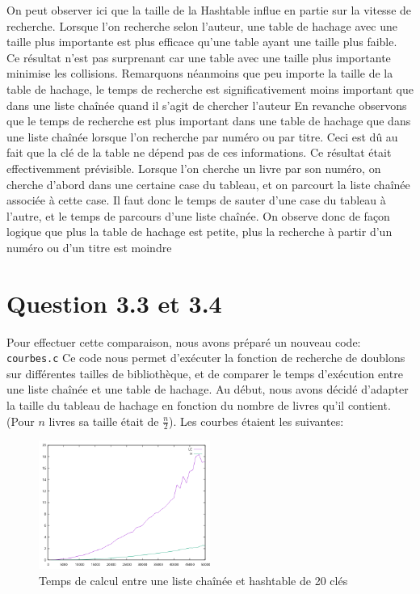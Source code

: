 \documentclass{article}
\begin{document}
    On peut observer ici que la taille de la Hashtable influe en partie sur la vitesse de recherche.
    \newline
    Lorsque l'on recherche selon l'auteur, une table de hachage avec une taille plus importante
    est plus efficace qu'une table ayant une taille plus faible. Ce résultat n'est pas surprenant
    car une table avec une taille plus importante minimise les collisions.
    \newline
    Remarquons néanmoins que peu importe la taille de la table de hachage, le temps de recherche
    est significativement moins important que dans une liste chaînée quand il s'agit de chercher l'auteur
    \newline
    En revanche observons que le temps de recherche est plus important dans une table de hachage que
    dans une liste chaînée lorsque l'on recherche par numéro ou par titre. Ceci est dû au fait que la
    clé de la table ne dépend pas de ces informations. Ce résultat était effectivemment prévisible.
    \newline
    Lorsque l'on cherche un livre par son numéro, on cherche d'abord dans une certaine case du tableau,
    et on parcourt la liste chaînée associée à cette case. Il faut donc le temps de sauter d'une case
    du tableau à l'autre, et le temps de parcours d'une liste chaînée.
    \newline
    On observe donc de façon logique que plus la table de hachage est petite, plus la recherche à partir
    d'un numéro ou d'un titre est moindre
    
    \newpage
    \section{Question 3.3 et 3.4}
    Pour effectuer cette comparaison, nous avons préparé un nouveau code: 
    \texttt{courbes.c}
    \newline
    Ce code nous permet d'exécuter la fonction de recherche de doublons sur 
    différentes tailles de bibliothèque, et de comparer le temps d'exécution
    entre une liste chaînée et une table de hachage.
    \newline
    Au début, nous avons décidé d'adapter la taille du tableau de hachage en
    fonction du nombre de livres qu'il contient. (Pour $n$ livres sa taille
    était de $\frac{n}{2}$). 
    \newline
    Les courbes étaient les suivantes:
    \begin{figure}[h]
        \centering
        \includegraphics[width=0.5\textwidth]{graph.png}
        \caption{Temps de calcul entre une liste chaînée et hashtable de 20 clés}
        \label{fig:hash20}
    \end{figure}


        
\end{document}

